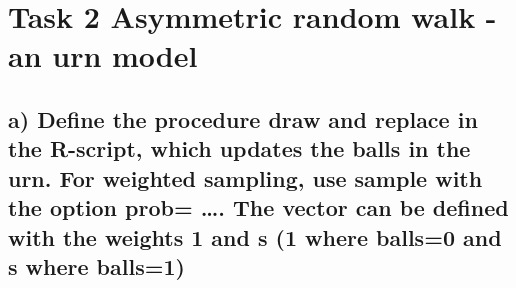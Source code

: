 \documentclass[
]{article}
\begin{document}
\hypertarget{task-2-asymmetric-random-walk---an-urn-model}{%
\section{Task 2 Asymmetric random walk - an urn
model}\label{task-2-asymmetric-random-walk---an-urn-model}}

\hypertarget{a-define-the-procedure-draw-and-replace-in-the-r-script-which-updates-the-balls-in-the-urn.-for-weighted-sampling-use-sample-with-the-option-prob-.-the-vector-can-be-defined-with-the-weights-1-and-s-1-where-balls0-and-s-where-balls1}{%
\subsection{a) Define the procedure draw and replace in the R-script,
which updates the balls in the urn. For weighted sampling, use sample
with the option prob= \ldots. The vector can be defined with the weights
1 and s (1 where balls=0 and s where
balls=1)}\label{a-define-the-procedure-draw-and-replace-in-the-r-script-which-updates-the-balls-in-the-urn.-for-weighted-sampling-use-sample-with-the-option-prob-.-the-vector-can-be-defined-with-the-weights-1-and-s-1-where-balls0-and-s-where-balls1}}
\end{document}
